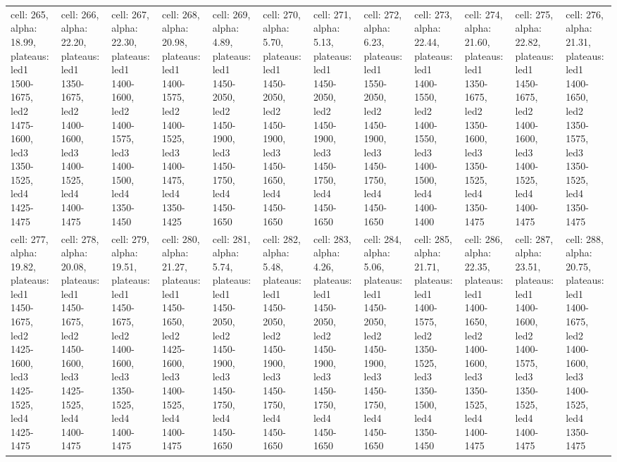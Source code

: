 \documentclass{article}
\begin{document}
\begin{landscape}
\begin{longtable}{|p{1.5cm}|p{1.5cm}|p{1.5cm}|p{1.5cm}|p{1.5cm}|p{1.5cm}|p{1.5cm}|p{1.5cm}|p{1.5cm}|p{1.5cm}|p{1.5cm}|p{1.5cm}|}
\rowcolor{lightgray} cell: 265, alpha: 18.99, plateaus: led1 1500-1675, led2 1475-1600, led3 1350-1525, led4 1425-1475 &cell: 266, alpha: 22.20, plateaus: led1 1350-1675, led2 1400-1600, led3 1400-1525, led4 1400-1475 &cell: 267, alpha: 22.30, plateaus: led1 1400-1600, led2 1400-1575, led3 1400-1500, led4 1350-1450 &cell: 268, alpha: 20.98, plateaus: led1 1400-1575, led2 1400-1525, led3 1400-1475, led4 1350-1425 &cell: 269, alpha: 4.89, plateaus: led1 1450-2050, led2 1450-1900, led3 1450-1750, led4 1450-1650 &cell: 270, alpha: 5.70, plateaus: led1 1450-2050, led2 1450-1900, led3 1450-1650, led4 1450-1650 &cell: 271, alpha: 5.13, plateaus: led1 1450-2050, led2 1450-1900, led3 1450-1750, led4 1450-1650 &cell: 272, alpha: 6.23, plateaus: led1 1550-2050, led2 1450-1900, led3 1450-1750, led4 1450-1650 &cell: 273, alpha: 22.44, plateaus: led1 1400-1550, led2 1400-1550, led3 1400-1500, led4 1400-1400 &cell: 274, alpha: 21.60, plateaus: led1 1350-1675, led2 1350-1600, led3 1350-1525, led4 1350-1475 &cell: 275, alpha: 22.82, plateaus: led1 1450-1675, led2 1400-1600, led3 1400-1525, led4 1400-1475 &cell: 276, alpha: 21.31, plateaus: led1 1400-1650, led2 1350-1575, led3 1350-1525, led4 1350-1475 \\
cell: 277, alpha: 19.82, plateaus: led1 1450-1675, led2 1425-1600, led3 1425-1525, led4 1425-1475 &cell: 278, alpha: 20.08, plateaus: led1 1450-1675, led2 1450-1600, led3 1425-1525, led4 1400-1475 &cell: 279, alpha: 19.51, plateaus: led1 1450-1675, led2 1400-1600, led3 1350-1525, led4 1400-1475 &cell: 280, alpha: 21.27, plateaus: led1 1450-1650, led2 1425-1600, led3 1400-1525, led4 1400-1475 &cell: 281, alpha: 5.74, plateaus: led1 1450-2050, led2 1450-1900, led3 1450-1750, led4 1450-1650 &cell: 282, alpha: 5.48, plateaus: led1 1450-2050, led2 1450-1900, led3 1450-1750, led4 1450-1650 &cell: 283, alpha: 4.26, plateaus: led1 1450-2050, led2 1450-1900, led3 1450-1750, led4 1450-1650 &cell: 284, alpha: 5.06, plateaus: led1 1450-2050, led2 1450-1900, led3 1450-1750, led4 1450-1650 &cell: 285, alpha: 21.71, plateaus: led1 1400-1575, led2 1350-1525, led3 1350-1500, led4 1350-1450 &cell: 286, alpha: 22.35, plateaus: led1 1400-1650, led2 1400-1600, led3 1350-1525, led4 1400-1475 &cell: 287, alpha: 23.51, plateaus: led1 1400-1600, led2 1400-1575, led3 1350-1525, led4 1400-1475 &cell: 288, alpha: 20.75, plateaus: led1 1400-1675, led2 1400-1600, led3 1400-1525, led4 1350-1475 \\
\end{longtable}
\end{landscape}
\end{document}
